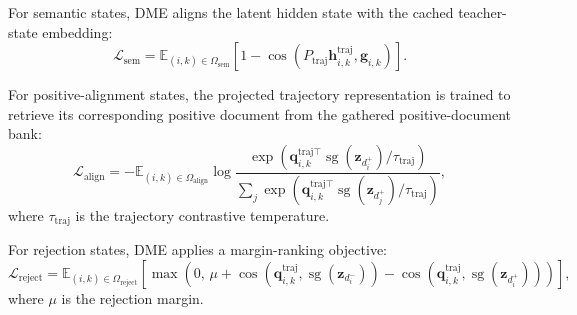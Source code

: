 For semantic states, DME aligns the latent hidden state with the cached teacher-state embedding:
\begin{equation}
    \mathcal{L}_{\mathrm{sem}}
    =
    \mathbb{E}_{
        (i,k)
        \in
        \Omega_{\mathrm{sem}}
    }
    \left[
        1
        -
        \cos
        \left(
            P_{\mathrm{traj}}
            \mathbf{h}_{i,k}^{\mathrm{traj}},
            \mathbf{g}_{i,k}
        \right)
    \right].
\label{eq:app-semantic-state-loss}
\end{equation}

For positive-alignment states, the projected trajectory representation is trained to retrieve its corresponding positive document from the gathered positive-document bank:
\begin{equation}
    \mathcal{L}_{\mathrm{align}}
    =
    -
    \mathbb{E}_{
        (i,k)
        \in
        \Omega_{\mathrm{align}}
    }
    \log
    \frac{
        \exp
        \left(
            \mathbf{q}_{i,k}^{\mathrm{traj}\top}
            \operatorname{sg}
            \left(
                \mathbf{z}_{d_i^+}
            \right)
            /
        \tau_{\mathrm{traj}}
        \right)
    }{
        \sum_j
        \exp
        \left(
            \mathbf{q}_{i,k}^{\mathrm{traj}\top}
            \operatorname{sg}
            \left(
                \mathbf{z}_{d_j^+}
            \right)
            /
        \tau_{\mathrm{traj}}
        \right)
    },
\label{eq:app-positive-alignment-loss}
\end{equation}
where $\tau_{\mathrm{traj}}$ is the trajectory contrastive temperature.

For rejection states, DME applies a margin-ranking objective:
\begin{equation}
    \mathcal{L}_{\mathrm{reject}}
    =
    \mathbb{E}_{
        (i,k)
        \in
        \Omega_{\mathrm{reject}}
    }
    \left[
        \max
        \left(
            0,\,
            \mu
            +
            \cos
            \left(
                \mathbf{q}_{i,k}^{\mathrm{traj}},
                \operatorname{sg}
                \left(
                    \mathbf{z}_{d_i^-}
                \right)
            \right)
            -
            \cos
            \left(
                \mathbf{q}_{i,k}^{\mathrm{traj}},
                \operatorname{sg}
                \left(
                    \mathbf{z}_{d_i^+}
                \right)
            \right)
        \right)
    \right],
\label{eq:app-negative-rejection-loss}
\end{equation}
where $\mu$ is the rejection margin.

